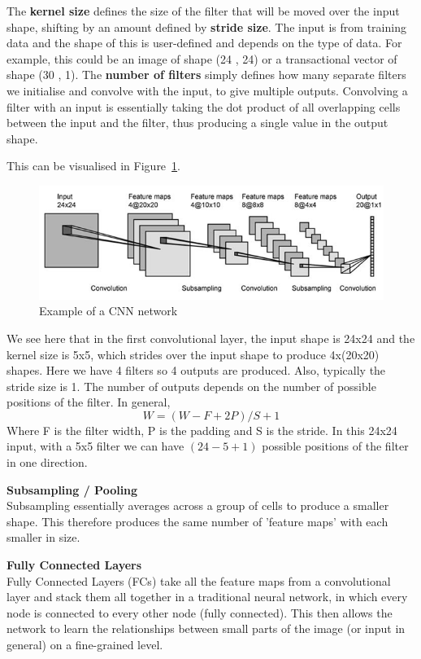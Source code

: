 \documentclass[12pt,a4paper,twoside]{report}
\begin{document}
The \textbf{kernel size} defines the size of the filter that will be moved over the input shape, shifting by an amount defined by \textbf{stride size}. The input is from training data and the shape of this is user-defined and depends on the type of data. For example, this could be an image of shape (24 , 24) or a transactional vector of shape (30 , 1). The \textbf{number of filters} simply defines how many separate filters we initialise and convolve with the input, to give multiple outputs. Convolving a filter with an input is essentially taking the dot product of all overlapping cells between the input and the filter, thus producing a single value in the output shape. 

This can be visualised in Figure~\ref{fig:cnn-example-prep}.

\begin{figure}[!htbp]

\centering
\includegraphics[width=\textwidth]{CNN-Example}
\caption{Example of a CNN network}
\label{fig:cnn-example-prep}
\end{figure}

We see here that in the first convolutional layer, the input shape is 24x24 and the kernel size is 5x5, which strides over the input shape to produce 4x(20x20) shapes. Here we have 4 filters so 4 outputs are produced. Also, typically the stride size is 1. The number of outputs depends on the number of possible positions of the filter. In general, $$W=(W-F+2P)/S+1$$ Where F is the filter width, P is the padding and S is the stride. In this 24x24 input, with a 5x5 filter we can have $(24-5+1)$ possible positions of the filter in one direction. 

\textbf{Subsampling / Pooling}\\
Subsampling essentially averages across a group of cells to produce a smaller shape. This therefore produces the same number of 'feature maps' with each smaller in size. 

\textbf{Fully Connected Layers}\\
Fully Connected Layers (FCs) take all the feature maps from a convolutional layer and stack them all together in a traditional neural network, in which every node is connected to every other node (fully connected). This then allows the network to learn the relationships between small parts of the image (or input in general) on a fine-grained level. 
\end{document}
